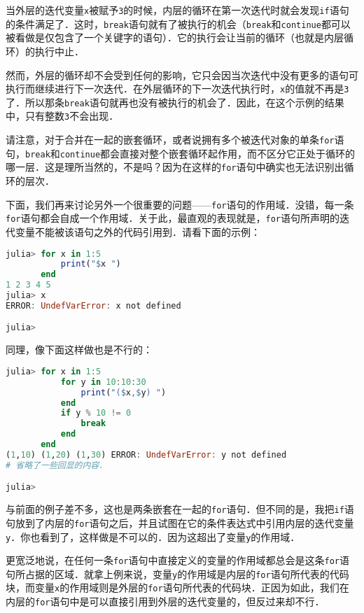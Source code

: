 当外层的迭代变量\verb|x|被赋予\verb|3|的时候，内层的循环在第一次迭代时就会发现\verb|if|语句的条件满足了．这时，\verb|break|语句就有了被执行的机会（\verb|break|和\verb|continue|都可以被看做是仅包含了一个关键字的语句）．它的执行会让当前的循环（也就是内层循环）的执行中止．

然而，外层的循环却不会受到任何的影响，它只会因当次迭代中没有更多的语句可执行而继续进行下一次迭代．在外层循环的下一次迭代执行时，\verb|x|的值就不再是\verb|3|了．所以那条\verb|break|语句就再也没有被执行的机会了．因此，在这个示例的结果中，只有整数\verb|3|不会出现．

请注意，对于合并在一起的嵌套循环，或者说拥有多个被迭代对象的单条\verb|for|语句，\verb|break|和\verb|continue|都会直接对整个嵌套循环起作用，而不区分它正处于循环的哪一层．这是理所当然的，不是吗？因为在这样的\verb|for|语句中确实也无法识别出循环的层次．

下面，我们再来讨论另外一个很重要的问题——\verb|for|语句的作用域．没错，每一条\verb|for|语句都会自成一个作用域．关于此，最直观的表现就是，\verb|for|语句所声明的迭代变量不能被该语句之外的代码引用到．请看下面的示例：
\begin{lstlisting}[language=julia]
julia> for x in 1:5
           print("$x ")
       end
1 2 3 4 5 
julia> x
ERROR: UndefVarError: x not defined

julia> 
\end{lstlisting}

同理，像下面这样做也是不行的：
\begin{lstlisting}[language=julia]
julia> for x in 1:5
           for y in 10:10:30
               print("($x,$y) ")
           end
           if y % 10 != 0 
               break
           end
       end
(1,10) (1,20) (1,30) ERROR: UndefVarError: y not defined
# 省略了一些回显的内容．

julia> 
\end{lstlisting}

与前面的例子差不多，这也是两条嵌套在一起的\verb|for|语句．但不同的是，我把\verb|if|语句放到了内层的\verb|for|语句之后，并且试图在它的条件表达式中引用内层的迭代变量\verb|y|．你也看到了，这样做是不可以的．因为这超出了变量\verb|y|的作用域．

更宽泛地说，在任何一条\verb|for|语句中直接定义的变量的作用域都总会是这条\verb|for|语句所占据的区域．就拿上例来说，变量\verb|y|的作用域是内层的\verb|for|语句所代表的代码块，而变量\verb|x|的作用域则是外层的\verb|for|语句所代表的代码块．正因为如此，我们在内层的\verb|for|语句中是可以直接引用到外层的迭代变量的，但反过来却不行．

